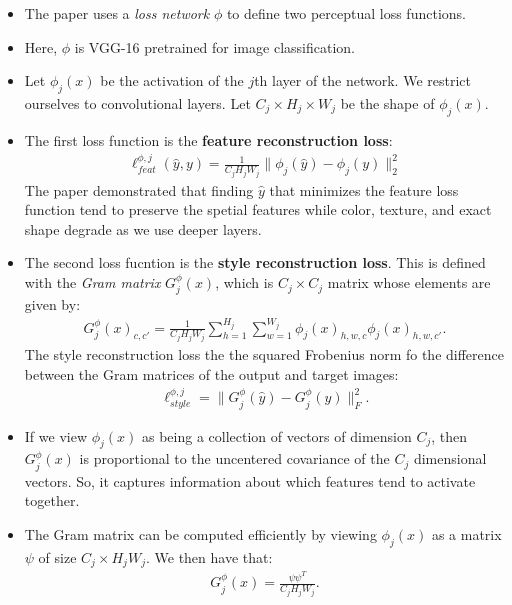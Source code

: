 \documentclass[10pt]{article}
\begin{document}
  \begin{itemize}
    \item The paper uses a \emph{loss network} $\phi$ to define two perceptual loss functions.

    \item Here, $\phi$ is VGG-16 pretrained for image classification.

    \item Let $\phi_j(x)$ be the activation of the $j$th layer of the network. We restrict ourselves to convolutional layers. Let $C_j \times H_j \times W_j$ be the shape of $\phi_j(x)$.

    \item The first loss function is the \textbf{feature reconstruction loss}:
    \begin{align*}
      \ell^{\phi,j}_{feat} (\hat{y}, y) = \frac{1}{C_j H_j W_j} \| \phi_j(\hat{y}) - \phi_j(y) \|^2_2
    \end{align*}
    The paper demonstrated that finding $\hat{y}$ that minimizes the feature loss function tend to preserve the spetial features while color, texture, and exact shape degrade as we use deeper layers.

    \item The second loss fucntion is the \textbf{style reconstruction loss}. This is defined with the \emph{Gram matrix} $G^{\phi}_j(x)$, which is $C_j \times C_j$  matrix whose elements are given by:
    \begin{align*}
      G_j^\phi(x)_{c, c'} = \frac{1}{C_j H_j W_j} \sum_{h=1}^{H_j} \sum_{w=1}^{W_j} \phi_j(x)_{h,w,c} \phi_j(x)_{h,w,c'}.
    \end{align*}
    The style reconstruction loss the the squared Frobenius norm fo the difference between the Gram matrices of the output and target images:
    \begin{align*}
      \ell_{style}^{\phi,j} = \| G_j^\phi(\hat{y}) - G_j^\phi(y) \|_F^2.
    \end{align*}
    
    \item If we view $\phi_j(x)$ as being a collection of vectors of dimension $C_j$, then $G_j^{\phi}(x)$ is proportional to the uncentered covariance of the $C_j$ dimensional vectors. So, it captures information about which features tend to activate together.

    \item The Gram matrix can be computed efficiently by viewing $\phi_j(x)$ as a matrix $\psi$ of size $C_j \times H_jW_j$. We then have that:
    \begin{align*}
      G_j^{\phi}(x) = \frac{\psi \psi^T}{C_j H_j W_j}.
    \end{align*}


\end{itemize}
\end{document}
